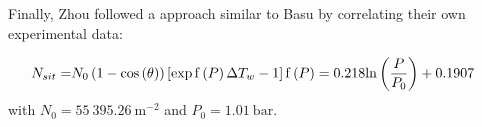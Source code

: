 Finally, Zhou \etal followed a approach similar to Basu \etal by correlating their own experimental data:

\begin{align}
N_{sit} =& N_{0}\left( 1-\mathrm{cos}\left( \theta \right) \right)\left[ \exp{\mathrm{f}\left( P \right) \Delta T_{w} } -1  \right]
\mathrm{f}\left( P \right) = 0.218\mathrm{ln}\left( \dfrac{P}{P_{0}} \right)+0.1907
\end{align}
with $N_{0}=55~395.26\ \mathrm{m}^{-2}$ and $P_{0}=1.01\ \mathrm{bar}$.
